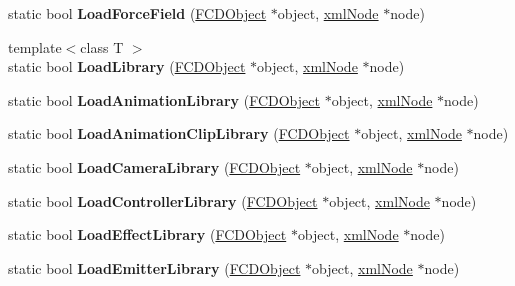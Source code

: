 \begin{DoxyCompactItemize}
\item 
\hypertarget{classFArchiveXML_a634d59668009bd2fda13656b90304993}{
static bool {\bfseries LoadForceField} (\hyperlink{classFCDObject}{FCDObject} $\ast$object, \hyperlink{struct__xmlNode}{xmlNode} $\ast$node)}
\label{classFArchiveXML_a634d59668009bd2fda13656b90304993}

\item 
\hypertarget{classFArchiveXML_a393c060981bea9bebcd033c86428c246}{
{\footnotesize template$<$class T $>$ }\\static bool {\bfseries LoadLibrary} (\hyperlink{classFCDObject}{FCDObject} $\ast$object, \hyperlink{struct__xmlNode}{xmlNode} $\ast$node)}
\label{classFArchiveXML_a393c060981bea9bebcd033c86428c246}

\item 
\hypertarget{classFArchiveXML_a1aa5d6c15add9802dbcd4f5d8444b546}{
static bool {\bfseries LoadAnimationLibrary} (\hyperlink{classFCDObject}{FCDObject} $\ast$object, \hyperlink{struct__xmlNode}{xmlNode} $\ast$node)}
\label{classFArchiveXML_a1aa5d6c15add9802dbcd4f5d8444b546}

\item 
\hypertarget{classFArchiveXML_a6d626a607be69305bd828079d21b0e34}{
static bool {\bfseries LoadAnimationClipLibrary} (\hyperlink{classFCDObject}{FCDObject} $\ast$object, \hyperlink{struct__xmlNode}{xmlNode} $\ast$node)}
\label{classFArchiveXML_a6d626a607be69305bd828079d21b0e34}

\item 
\hypertarget{classFArchiveXML_acec8ee660cfd5b3e35c7f45fca2794ad}{
static bool {\bfseries LoadCameraLibrary} (\hyperlink{classFCDObject}{FCDObject} $\ast$object, \hyperlink{struct__xmlNode}{xmlNode} $\ast$node)}
\label{classFArchiveXML_acec8ee660cfd5b3e35c7f45fca2794ad}

\item 
\hypertarget{classFArchiveXML_aac999f8eb64c3c747f4dfd7224ba1abf}{
static bool {\bfseries LoadControllerLibrary} (\hyperlink{classFCDObject}{FCDObject} $\ast$object, \hyperlink{struct__xmlNode}{xmlNode} $\ast$node)}
\label{classFArchiveXML_aac999f8eb64c3c747f4dfd7224ba1abf}

\item 
\hypertarget{classFArchiveXML_a732a244adfa1ccb499d3272f7969792d}{
static bool {\bfseries LoadEffectLibrary} (\hyperlink{classFCDObject}{FCDObject} $\ast$object, \hyperlink{struct__xmlNode}{xmlNode} $\ast$node)}
\label{classFArchiveXML_a732a244adfa1ccb499d3272f7969792d}

\item 
\hypertarget{classFArchiveXML_a00547f5cc81d25d6b3935523029bf4a3}{
static bool {\bfseries LoadEmitterLibrary} (\hyperlink{classFCDObject}{FCDObject} $\ast$object, \hyperlink{struct__xmlNode}{xmlNode} $\ast$node)}
\label{classFArchiveXML_a00547f5cc81d25d6b3935523029bf4a3}


\end{DoxyCompactItemize}
